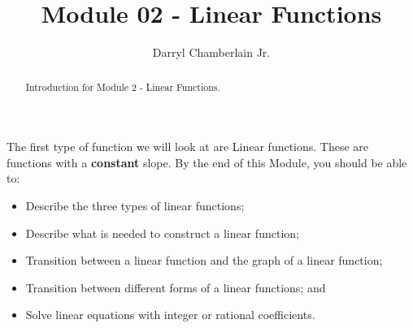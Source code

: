 \documentclass{ximera}
\author{Darryl Chamberlain Jr.}
\title{Module 02 - Linear Functions}
\begin{document}
\begin{abstract}
Introduction for Module 2 - Linear Functions.
\end{abstract}
\maketitle

The first type of function we will look at are Linear functions. These are functions with a \textbf{constant} slope. By the end of this Module, you should be able to:

\begin{itemize}
	\item Describe the three types of linear functions;
	\item Describe what is needed to construct a linear function;
	\item Transition between a linear function and the graph of a linear function;
	\item Transition between different forms of a linear functions; and 
	\item Solve linear equations with integer or rational coefficients.
\end{itemize}
\end{document}
